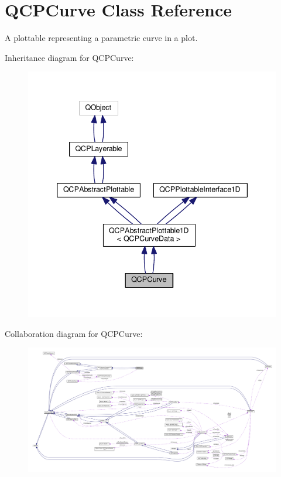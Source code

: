 \hypertarget{class_q_c_p_curve}{}\section{Q\+C\+P\+Curve Class Reference}
\label{class_q_c_p_curve}


A plottable representing a parametric curve in a plot.  




Inheritance diagram for Q\+C\+P\+Curve\+:\nopagebreak
\begin{figure}[H]
\begin{center}
\leavevmode
\includegraphics[width=339pt]{class_q_c_p_curve__inherit__graph}
\end{center}
\end{figure}


Collaboration diagram for Q\+C\+P\+Curve\+:\nopagebreak
\begin{figure}[H]
\begin{center}
\leavevmode
\includegraphics[width=350pt]{class_q_c_p_curve__coll__graph}
\end{center}
\end{figure}

